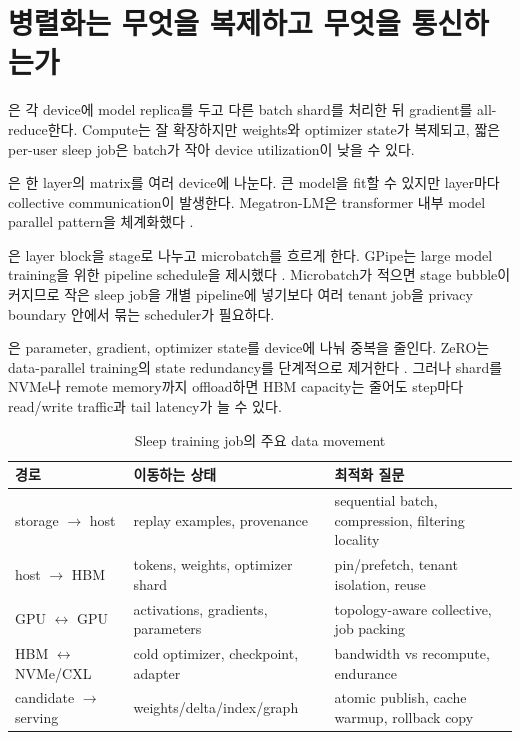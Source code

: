\section{병렬화는 무엇을 복제하고 무엇을 통신하는가}

은 각 device에 model replica를 두고 다른 batch shard를
처리한 뒤 gradient를 all-reduce한다. Compute는 잘 확장하지만 weights와 optimizer state가 복제되고,
짧은 per-user sleep job은 batch가 작아 device utilization이 낮을 수 있다.

은 한 layer의 matrix를 여러 device에 나눈다. 큰 model을
fit할 수 있지만 layer마다 collective communication이 발생한다. Megatron-LM은 transformer 내부 model
parallel pattern을 체계화했다 \parencite{shoeybi2019megatron}.

은 layer block을 stage로 나누고 microbatch를 흐르게
한다. GPipe는 large model training을 위한 pipeline schedule을 제시했다 \parencite{huang2019gpipe}.
Microbatch가 적으면 stage bubble이 커지므로 작은 sleep job을 개별 pipeline에 넣기보다 여러 tenant job을
privacy boundary 안에서 묶는 scheduler가 필요하다.

은 parameter, gradient, optimizer state를 device에 나눠 중복을 줄인다. ZeRO는
data-parallel training의 state redundancy를 단계적으로 제거한다 \parencite{rajbhandari2020zero}.
그러나 shard를 NVMe나 remote memory까지 offload하면 HBM capacity는 줄어도 step마다 read/write traffic과
tail latency가 늘 수 있다.

\begin{table}[htbp]
\centering
\caption{Sleep training job의 주요 data movement}
\label{tab:bg-training-data-movement}
\small
\begin{tabularx}{\textwidth}{p{} X X}
\toprule
경로 & 이동하는 상태 & 최적화 질문 \\
\midrule
storage $\rightarrow$ host & replay examples, provenance & sequential batch, compression, filtering locality \\
host $\rightarrow$ HBM & tokens, weights, optimizer shard & pin/prefetch, tenant isolation, reuse \\
GPU $\leftrightarrow$ GPU & activations, gradients, parameters & topology-aware collective, job packing \\
HBM $\leftrightarrow$ NVMe/CXL & cold optimizer, checkpoint, adapter & bandwidth vs recompute, endurance \\
candidate $\rightarrow$ serving & weights/delta/index/graph & atomic publish, cache warmup, rollback copy \\
\bottomrule
\end{tabularx}
\end{table}

